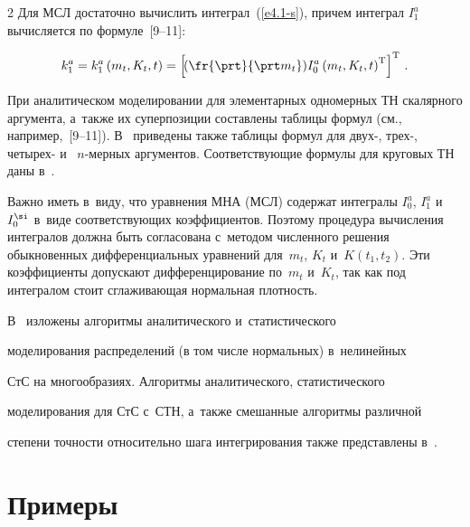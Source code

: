\begin{multicols}{2}
Для МСЛ достаточно вычислить интеграл~(\ref{e4.1-s}), причем интеграл  $I_1^a$ вычисляется по формуле~[9--11]:



\noindent

    \begin{equation*}

k_1^a = k_1^a \left(m_t, K_t, t\right)=

    \left[ \!\left( \fr{\prt}{\prt m_t}\right) \!I_0^a \left(m_t, K_t, t\right)^{\mathrm{T}}\right]^{\mathrm{T}}\,. %

    \end{equation*}



При аналитическом моделировании для элементарных одномерных ТН скалярного аргумента, а~также их суперпозиции составлены таблицы формул (см., например,~[9--11]). В~\cite{11-s} приведены также таблицы формул для двух-, трех-, четырех- и~ $n$-мер\-ных аргументов. Соответствующие формулы для круговых ТН даны в~\cite{13-s, 14-s}.



Важно иметь в~виду, что уравнения МНА (МСЛ) содержат интегралы $I_0^a$, $I_1^a$ и~$I_0^\si$ в~виде соответ\-ствующих коэффициентов. Поэтому процедура вычис\-ле\-ния интегралов должна быть согласована с~методом чис\-лен\-но\-го решения обыкновенных дифференциальных уравнений для~$m_t$, $K_t$ и~$K(t_1, t_2)$. Эти коэффициенты допускают дифференцирование по~$m_t$ и~$K_t$, так как под интегралом стоит сглаживающая нормальная плотность.



В~\cite{12-s} изложены алгоритмы аналитического и~статистического

моделирования распределений (в том числе нормальных) в~нелинейных

СтС на многообразиях. Алгоритмы аналитического, статистического

моделирования для СтС с~СТН, а~также смешанные алгоритмы различной

степени точ\-ности относительно шага интегрирования также представлены в~\cite{12-s}.



  \vspace*{-6pt}





\section{Примеры}




\end{multicols}
